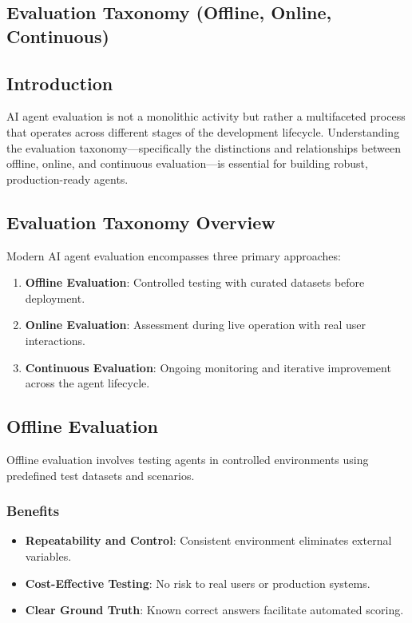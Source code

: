 \begin{TNtwocol}
\section{Evaluation Taxonomy (Offline, Online, Continuous)}
\subsection{Introduction}
AI agent evaluation is not a monolithic activity but rather a multifaceted process that operates across different stages of the development lifecycle. Understanding the evaluation taxonomy---specifically the distinctions and relationships between offline, online, and continuous evaluation---is essential for building robust, production-ready agents.

\subsection{Evaluation Taxonomy Overview}
Modern AI agent evaluation encompasses three primary approaches:
\begin{enumerate}
    \item \textbf{Offline Evaluation}: Controlled testing with curated datasets before deployment.
    \item \textbf{Online Evaluation}: Assessment during live operation with real user interactions.
    \item \textbf{Continuous Evaluation}: Ongoing monitoring and iterative improvement across the agent lifecycle.
\end{enumerate}

\subsection{Offline Evaluation}
Offline evaluation involves testing agents in controlled environments using predefined test datasets and scenarios.
\subsubsection{Benefits}
\begin{itemize}
    \item \textbf{Repeatability and Control}: Consistent environment eliminates external variables.
    \item \textbf{Cost-Effective Testing}: No risk to real users or production systems.
    \item \textbf{Clear Ground Truth}: Known correct answers facilitate automated scoring.
\end{itemize}

\end{TNtwocol}
